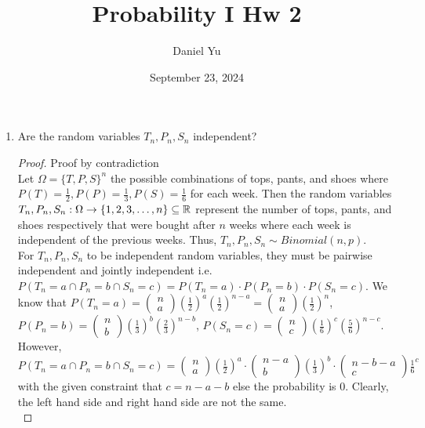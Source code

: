 \documentclass[a4paper]{article}
\title{\Huge{Probability I Hw 2}}
\author{\huge{Daniel Yu}}
\date{September 23, 2024}
\begin{document}
\maketitle
\newpage%
\pagebreak
\begin{enumerate}
  \item Are the random variables $T_n,P_n,S_n$ independent? 
    \begin{proof}{Proof by contradiction}\\
      Let $\Omega = \{T,P,S\}^n$ the possible combinations of tops, pants, and shoes where $P(T) = \frac{1}{2}, P(P)=\frac{1}{3}, 
      P(S) = \frac{1}{6}$ for each week. Then the random variables $T_n, P_n, S_n : \Omega \to \{1,2,3,\ldots,n\} \subseteq \mathbb{R} $ represent the number of tops, 
      pants, and shoes respectively that were bought after $n$ weeks where each week is independent of the previous 
      weeks. Thus, $T_n, P_n, S_n \sim Binomial(n,p)$. \\


      For $T_n, P_n, S_n$ to be independent random variables, they must be pairwise independent and 
      jointly independent i.e.  $P(T_n = a \cap P_n = b \cap S_n = c) = P(T_n=a) \cdot P(P_n=b) \cdot P(S_n=c)$. We 
      know that $P(T_n=a) = \begin{pmatrix} n \\ a \end{pmatrix} \left( \frac{1}{2} \right)^a \left( \frac{1}{2} \right)^{n-a}
      = \begin{pmatrix} n \\ a \end{pmatrix} \left( \frac{1}{2} \right)^n$, 
      $P(P_n = b) =  \begin{pmatrix} n \\ b \end{pmatrix} \left( \frac{1}{3} \right)^b \left( \frac{2}{3} \right)^{n-b} $, $P(S_n=c) =
       \begin{pmatrix} n \\ c \end{pmatrix} \left( \frac{1}{6} \right)^c \left( \frac{5}{6} \right)^{n-c} $. However, $P(T_n = a \cap P_n = b \cap S_n = c)
       = \begin{pmatrix} n\\ a\end{pmatrix} (\frac{1}{2})^a \cdot \begin{pmatrix} n-a \\ b \end{pmatrix} (\frac{1}{3})^b
       \cdot \begin{pmatrix} n - b - a \\ c \end{pmatrix} \frac{1}{6}^{c}$ with the given constraint that $c =  n - a -b$ else the probability is  $0$. 
       Clearly, the left hand side and right hand side are not the same. \\ 


\end{proof}
\end{enumerate}
\end{document}
